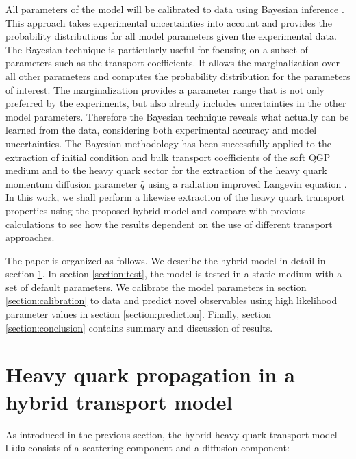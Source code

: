 \documentclass[aps, prc, reprint, amsmath, groupedaddress, nofootinbib]{revtex4-1}
\begin{document}
All parameters of the model will be calibrated to data using Bayesian inference \cite{Novak:2013bqa,Bernhard:2015hxa}.
This approach takes experimental uncertainties into account and provides the probability distributions for all model parameters given the experimental data.
The Bayesian technique is particularly useful for focusing on a subset of parameters such as the transport coefficients.
It allows the marginalization over all other parameters and computes the probability distribution for the parameters of interest. 
The marginalization provides a parameter range that is not only preferred by the experiments, but also already includes uncertainties in the other model parameters.
Therefore the Bayesian technique reveals what actually can be  learned from the data, considering both experimental accuracy and model uncertainties.
The Bayesian methodology has been successfully applied to the extraction of initial condition and bulk transport coefficients of the soft QGP medium \cite{Novak:2013bqa, Pratt:2015zsa, Bernhard:2015hxa, Bernhard:2016tnd, Auvinen:2017fjw} and to the heavy quark sector for the extraction of the heavy quark momentum diffusion parameter $\hat{q}$ using a radiation improved Langevin equation \cite{Xu:2017obm, Cao:2013ita}.
In this work, we shall perform a likewise extraction of the heavy quark transport properties using the proposed hybrid model and compare with previous calculations to see how the results dependent on the use of different transport approaches.

The paper is organized as follows. 
We describe the hybrid model in detail in section \ref{section:model}. In section \ref{section:test}, the model is tested in a static medium with a set of default parameters. 
We calibrate the model parameters in section \ref{section:calibration} to data and predict novel observables using high likelihood parameter values in section \ref{section:prediction}. 
Finally, section \ref{section:conclusion} contains summary and discussion of results.

\section{Heavy quark propagation in a hybrid transport model}\label{section:model}
As introduced in the previous section, the hybrid heavy quark transport model {\tt Lido} consists of a scattering component and a diffusion component:
\end{document}
